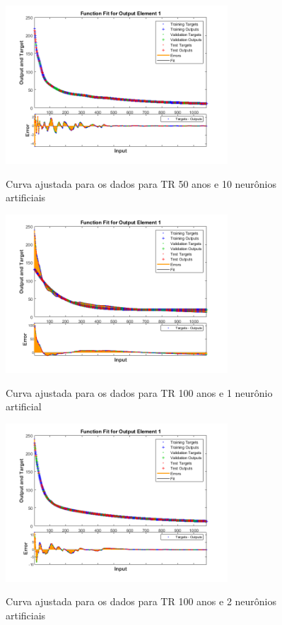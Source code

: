 \begin{figure}[h]
    \caption{Curva ajustada para os dados para TR 50 anos e 10 neurônios artificiais}
    \centering
    \includegraphics[width=0.74\textwidth]{Textuais/Figuras/NN/tr50-10neuronio.png}
    \label{fig:tr50-10n}
\end{figure}

\begin{figure}[h]
    \caption{Curva ajustada para os dados para TR 100 anos e 1 neurônio artificial}
    \centering
    \includegraphics[width=0.74\textwidth]{Textuais/Figuras/NN/tr100-1neuronio.png}
    \label{fig:tr100-1n}
\end{figure}

\begin{figure}[h]
    \caption{Curva ajustada para os dados para TR 100 anos e 2 neurônios artificiais}
    \centering
    \includegraphics[width=0.74\textwidth]{Textuais/Figuras/NN/tr100-2neuronio.png}
    \label{fig:tr100-2n}
\end{figure}

